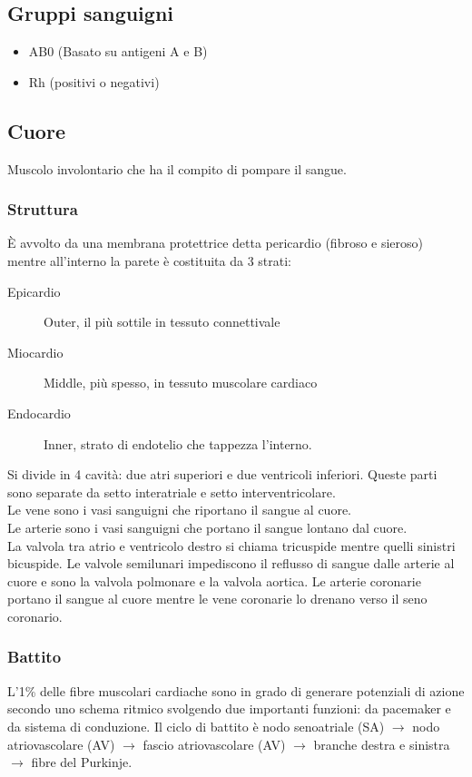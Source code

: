 \documentclass[a4paper]{article}
\begin{document}
\subsection{Gruppi sanguigni}
\begin{itemize}
    \item AB0 (Basato su antigeni A e B)
    \item Rh (positivi o negativi)
\end{itemize}

\subsection{Cuore}
Muscolo involontario che ha il compito di pompare il sangue.
\subsubsection{Struttura}
È avvolto da una membrana protettrice detta pericardio (fibroso e sieroso) 
mentre all’interno la parete è costituita da 3 strati:
\begin{description}
    \item[Epicardio] Outer, il più sottile in tessuto connettivale
    \item[Miocardio] Middle, più spesso, in tessuto muscolare cardiaco
    \item[Endocardio] Inner, strato di endotelio che tappezza l'interno.
\end{description}

Si divide in 4 cavità: due atri superiori e due ventricoli inferiori. Queste
parti sono separate da setto interatriale e setto interventricolare. \\
Le vene sono i vasi sanguigni che riportano il sangue al cuore. \\
Le arterie sono i vasi sanguigni che portano il sangue lontano dal cuore. \\
La valvola tra atrio e ventricolo destro si chiama tricuspide mentre quelli 
sinistri bicuspide. Le valvole semilunari impediscono il reflusso di sangue 
dalle arterie al cuore e sono la valvola polmonare e la valvola aortica. Le 
arterie coronarie portano il sangue al cuore mentre le vene coronarie lo
drenano verso il seno coronario.

\subsubsection{Battito}
L’1\% delle fibre muscolari cardiache sono in grado di generare potenziali 
di azione secondo uno schema ritmico svolgendo due importanti funzioni: da
pacemaker e da sistema di conduzione. Il ciclo di battito è nodo 
senoatriale (SA) $\to$ nodo atriovascolare (AV) $\to$ fascio atriovascolare
(AV) $\to$ branche destra e sinistra $\to$ fibre del Purkinje.
\end{document}
